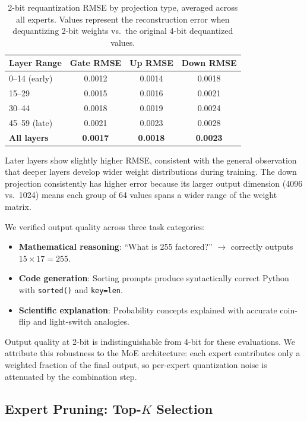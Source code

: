 \documentclass[11pt,twocolumn]{article}
\begin{document}
\begin{table}[t]
\centering
\small
\caption{2-bit requantization RMSE by projection type, averaged across all experts. Values represent the reconstruction error when dequantizing 2-bit weights vs.\ the original 4-bit dequantized values.}
\label{tab:rmse}
\begin{tabular}{@{}lccc@{}}
\toprule
\textbf{Layer Range} & \textbf{Gate RMSE} & \textbf{Up RMSE} & \textbf{Down RMSE} \\
\midrule
0--14 (early) & 0.0012 & 0.0014 & 0.0018 \\
15--29 & 0.0015 & 0.0016 & 0.0021 \\
30--44 & 0.0018 & 0.0019 & 0.0024 \\
45--59 (late) & 0.0021 & 0.0023 & 0.0028 \\
\midrule
\textbf{All layers} & \textbf{0.0017} & \textbf{0.0018} & \textbf{0.0023} \\
\bottomrule
\end{tabular}
\end{table}

Later layers show slightly higher RMSE, consistent with the general observation that deeper layers develop wider weight distributions during training.
The down projection consistently has higher error because its larger output dimension (4096 vs.\ 1024) means each group of 64 values spans a wider range of the weight matrix.

We verified output quality across three task categories:
\begin{itemize}[leftmargin=*,itemsep=2pt]
    \item \textbf{Mathematical reasoning}: ``What is 255 factored?'' $\to$ correctly outputs $15 \times 17 = 255$.
    \item \textbf{Code generation}: Sorting prompts produce syntactically correct Python with \texttt{sorted()} and \texttt{key=len}.
    \item \textbf{Scientific explanation}: Probability concepts explained with accurate coin-flip and light-switch analogies.
\end{itemize}

Output quality at 2-bit is indistinguishable from 4-bit for these evaluations.
We attribute this robustness to the MoE architecture: each expert contributes only a weighted fraction of the final output, so per-expert quantization noise is attenuated by the combination step.

\subsection{Expert Pruning: Top-$K$ Selection}
\end{document}
